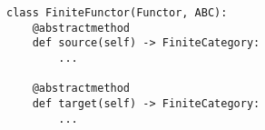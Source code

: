 \par\begin{minipage}{60ex}
\begin{verbatim}
class FiniteFunctor(Functor, ABC):
    @abstractmethod
    def source(self) -> FiniteCategory:
        ...

    @abstractmethod
    def target(self) -> FiniteCategory:
        ...
\end{verbatim}
\end{minipage}\par